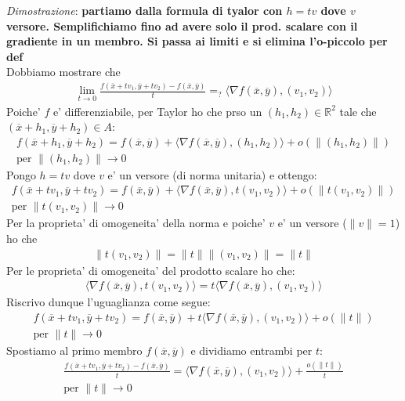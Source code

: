 \documentclass{article}
\begin{document}
\noindent \emph{Dimostrazione}: \textbf{partiamo dalla formula di tyalor con
$h = tv$ dove $v$ versore. Semplifichiamo fino ad avere solo il prod. scalare con
il gradiente in un membro. Si passa ai limiti e si elimina l'o-piccolo per def} \\
Dobbiamo mostrare che
\begin{align*}
  \lim_{t \to 0} \frac{f(\overline{x} + tv_1, \overline{y} + tv_2) - f(\overline{x}, \overline{y})}{t} =_?
  \langle \nabla f(\overline{x}, \overline{y}), (v_1, v_2) \rangle
\end{align*}
Poiche' $f$ e' differenziabile, per Taylor ho che prso un $(h_1, h_2) \in \mathbb{R}^2$ tale
che $(\overline{x} + h_1, \overline{y} + h_2) \in A$:
\begin{align*}
  f(\overline{x} + h_1, \overline{y} + h_2) = f(\overline{x}, \overline{y}) + \langle
  \nabla f(\overline{x}, \overline{y}), (h_1, h_2) \rangle + o(\|(h_1, h_2)\|) \\
  \text{per } \|(h_1, h_2)\| \to 0
\end{align*}
Pongo $h = tv$ dove $v$ e' un versore (di norma unitaria) e ottengo:
\begin{align*}
  f(\overline{x} + tv_1, \overline{y} + tv_2) = f(\overline{x}, \overline{y}) + \langle
  \nabla f(\overline{x}, \overline{y}), t(v_1, v_2) \rangle + o(\|t(v_1, v_2)\|) \\
  \text{per } \|t(v_1, v_2)\| \to 0
\end{align*}
Per la proprieta' di omogeneita' della norma e poiche' $v$ e' un versore ($\|v\| = 1$) ho che
\begin{align*}
  \|t(v_1, v_2)\| = \|t\| \|(v_1, v_2)\| = \|t\|
\end{align*}
Per le proprieta' di omogeneita' del prodotto scalare ho che:
\begin{align*}
  \langle \nabla f(\overline{x}, \overline{y}), t(v_1, v_2) \rangle = t \langle \nabla f(\overline{x}, \overline{y}), (v_1, v_2) \rangle
\end{align*}
Riscrivo dunque l'uguaglianza come segue:
\begin{align*}
  f(\overline{x} + tv_1, \overline{y} + tv_2) = f(\overline{x}, \overline{y}) + t \langle
  \nabla f(\overline{x}, \overline{y}), (v_1, v_2) \rangle + o(\|t\|) \\
  \text{per } \|t\| \to 0
\end{align*}
Spostiamo al primo membro $f(\overline{x}, \overline{y})$ e dividiamo entrambi per $t$:
\begin{align*}
  \frac{f(\overline{x} + tv_1, \overline{y} + tv_2) - f(\overline{x}, \overline{y})}{t} = \langle
  \nabla f(\overline{x}, \overline{y}), (v_1, v_2) \rangle + \frac{o(\|t\|)}{t} \\
  \text{per } \|t\| \to 0
\end{align*}
\end{document}
